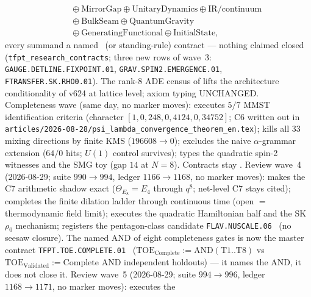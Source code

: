 \begin{keybox}
\[\begin{aligned}
    &\quad\oplus\mathrm{MirrorGap}\oplus\mathrm{UnitaryDynamics}\oplus\mathrm{IR/continuum}\\
    &\quad\oplus\mathrm{BulkSeam}\oplus\mathrm{QuantumGravity}\\
    &\quad\oplus\mathrm{GeneratingFunctional}\oplus\mathrm{InitialState},
  \end{aligned}
\]
every summand a named \mO\ (or standing-rule) contract --- nothing claimed closed
(\texttt{tfpt\_research\_contracts}; three new rows of wave~3:
\texttt{GAUGE.DETLINE.FIXPOINT.01}, \texttt{GRAV.SPIN2.EMERGENCE.01},
\texttt{FTRANSFER.SK.RHO0.01}).  The rank-8 ADE census of
 lifts the
architecture conditionality of v624 at lattice level; axiom typing UNCHANGED.
Completeness wave (same day, no marker moves):
 executes $5/7$ MMST identification criteria
(character $[1,0,248,0,4124,0,34752]$; C6 written out in
\texttt{articles/2026-08-28/psi\_lambda\_convergence\_theorem\_en.tex});
 kills all $33$ mixing directions by finite KMS
($196608\to 0$);
 excludes the naive $\alpha$-grammar extension
($64/0$ hits; $U(1)$ control survives);
 types the quadratic spin-2 witnesses and the SMG toy
(gap $14$ at $N=8$).  Contracts stay \mO.
Review wave~4 (2026-08-29; suite $990\to994$, ledger $1166\to1168$, no marker moves):
 makes the C7
arithmetic shadow exact ($\Theta_{E_8}=E_4$ through $q^8$; net-level C7 stays cited);
 completes the finite
dilation ladder through continuous time (open $=$ thermodynamic field limit);
 executes the
quadratic Hamiltonian half and the SK $\rho_0$ mechanism;
 registers the
pentagon-class candidate \texttt{FLAV.NUSCALE.06} \mC\ (no seesaw closure).
The named AND of eight completeness gates is now the master contract
\texttt{TFPT.TOE.COMPLETE.01} \mO\
($\mathrm{TOE}_{\mathrm{Complete}}:=\mathrm{AND}(\mathrm{T1}{..}\mathrm{T8})$ vs
$\mathrm{TOE}_{\mathrm{Validated}}:=\mathrm{Complete}$ AND independent holdouts) --- it
names the AND, it does not close it.
Review wave~5 (2026-08-29; suite $994\to996$, ledger $1168\to1171$, no marker moves):
\veri{v1002\_\allowbreak spin10\_\allowbreak mirror\_\allowbreak projector.py} executes the

\end{keybox}
